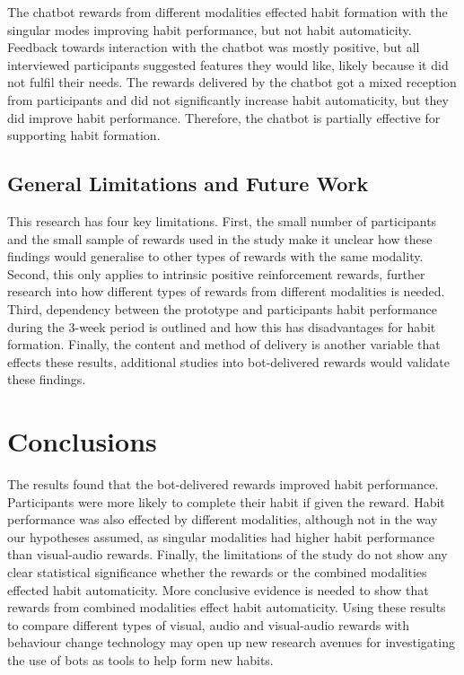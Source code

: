 \documentclass{scaffold/sigchi}
\begin{document}
The chatbot rewards from different modalities effected habit formation with the singular modes improving habit performance, but not habit automaticity. Feedback towards interaction with the chatbot was mostly positive, but all interviewed participants suggested features they would like, likely because it did not fulfil their needs. The rewards delivered by the chatbot got a mixed reception from participants and did not significantly increase habit automaticity, but they did improve habit performance. Therefore, the chatbot is partially effective for supporting habit formation.


\subsection{General Limitations and Future Work}
This research has four key limitations. First, the small number of participants and the small sample of rewards used in the study make it unclear how these findings would generalise to other types of rewards with the same modality. Second, this only applies to intrinsic positive reinforcement rewards, further research into how different types of rewards from different modalities is needed. Third, dependency between the prototype and participants habit performance during the 3-week period is outlined and how this has disadvantages for habit formation. Finally, the content and method of delivery is another variable that effects these results, additional studies into bot-delivered rewards would validate these findings. 

\section{Conclusions}
The results found that the bot-delivered rewards improved habit performance. Participants were more likely to complete their habit if given the reward. Habit performance was also effected by different modalities, although not in the way our hypotheses assumed, as singular modalities had higher habit performance than visual-audio rewards. Finally, the limitations of the study do not show any clear statistical significance whether the rewards or the combined modalities effected habit automaticity. More conclusive evidence is needed to show that rewards from combined modalities effect habit automaticity. Using these results to compare different types of visual, audio and visual-audio rewards with behaviour change technology may open up new research avenues for investigating the use of bots as tools to help form new habits.
\end{document}
